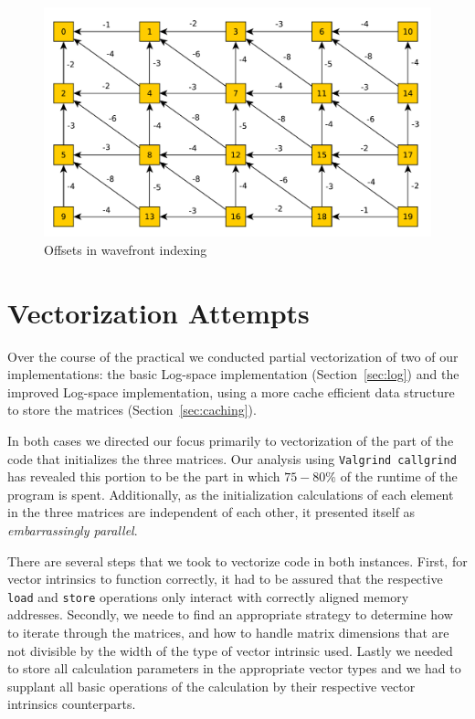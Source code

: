 \documentclass{article}
\begin{document}
\begin{figure}
\centering
\includegraphics[scale=0.5]{images/unnamed0.pdf}
\caption{Offsets in wavefront indexing}
\label{fig:offset}
\end{figure}


\section{Vectorization Attempts}
\label{sec:vector}
Over the course of the practical we conducted partial vectorization of two of our implementations: the basic Log-space implementation (Section~\ref{sec:log}) and the improved Log-space implementation, using a more cache efficient data structure to store the matrices (Section~\ref{sec:caching}).

In both cases we directed our focus primarily to vectorization of the part of the code that  initializes the three matrices. Our analysis using \texttt{Valgrind callgrind} has revealed this portion to be the part in which $75-80\%$ of the runtime of the program is spent. Additionally, as the initialization calculations of each element in the three matrices are independent of each other, it presented itself as \textit{embarrassingly parallel}.

There are several steps that we took to vectorize code in both instances. First, for vector intrinsics to function correctly, it had to be assured that the respective \texttt{load} and \texttt{store} operations only interact with correctly aligned memory addresses. Secondly, we neede to find an appropriate strategy to determine how to iterate through the matrices, and how to handle matrix dimensions that are not divisible by the width of the type of vector intrinsic used. Lastly we needed to store all calculation parameters in the appropriate vector types and we had to supplant all basic operations of the calculation by their respective vector intrinsics counterparts.
\end{document}
